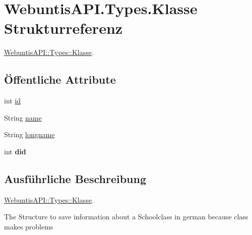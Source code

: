 \hypertarget{struct_webuntis_a_p_i_1_1_types_1_1_klasse}{\section{Webuntis\-A\-P\-I.\-Types.\-Klasse Strukturreferenz}
\label{struct_webuntis_a_p_i_1_1_types_1_1_klasse}
}


\hyperlink{struct_webuntis_a_p_i_1_1_types_1_1_klasse}{Webuntis\-A\-P\-I\-::\-Types\-::\-Klasse}.  


\subsection*{Öffentliche Attribute}
\begin{DoxyCompactItemize}
\item 
int \hyperlink{struct_webuntis_a_p_i_1_1_types_1_1_klasse_a0c8d6c1ce71142b67d20df2c818bbc75}{id}
\item 
String \hyperlink{struct_webuntis_a_p_i_1_1_types_1_1_klasse_a034b759d9d7262da6eaa0613d5f6a0e7}{name}
\item 
String \hyperlink{struct_webuntis_a_p_i_1_1_types_1_1_klasse_a0ec00ea38031e97b255fa139387142e7}{longname}
\item 
\hypertarget{struct_webuntis_a_p_i_1_1_types_1_1_klasse_a0441c438c8e4098068dadb84615d847e}{int {\bfseries did}}\label{struct_webuntis_a_p_i_1_1_types_1_1_klasse_a0441c438c8e4098068dadb84615d847e}

\end{DoxyCompactItemize}


\subsection{Ausführliche Beschreibung}
\hyperlink{struct_webuntis_a_p_i_1_1_types_1_1_klasse}{Webuntis\-A\-P\-I\-::\-Types\-::\-Klasse}. 

The Structure to save information about a Schoolclass in german because class makes problems 

